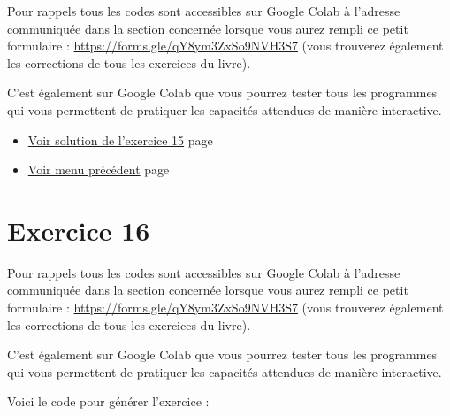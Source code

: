 \documentclass[a4paper,11pt]{book}
\begin{document}
\newpage

Pour rappels tous les codes sont accessibles sur Google Colab à
l'adresse communiquée dans la section concernée lorsque vous
aurez rempli ce petit formulaire : \url{https://forms.gle/qY8ym3ZxSo9NVH3S7}
(vous trouverez également les corrections de tous les exercices du
livre).

C'est également sur Google Colab que vous pourrez tester tous les
programmes qui vous permettent de pratiquer les capacités attendues
de manière interactive.


\begin{itemize}
\item \hyperref[orgb7308e1]{Voir solution de l'exercice 15}
page~\pageref{page:sec9.3.1-sol15}
\item \hyperref[org67109aa]{Voir menu précédent}
page~\pageref{page:capacity3}
\end{itemize}

\clearpage

\section{Exercice 16}
\label{sec:orgd834dec}
\label{org70c1962}
\label{page:sec3.4.2exo16}

Pour rappels tous les codes sont accessibles sur Google Colab à
l'adresse communiquée dans la section concernée lorsque vous
aurez rempli ce petit formulaire : \url{https://forms.gle/qY8ym3ZxSo9NVH3S7}
(vous trouverez également les corrections de tous les exercices du
livre).

C'est également sur Google Colab que vous pourrez tester tous les
programmes qui vous permettent de pratiquer les capacités attendues
de manière interactive.


Voici le code pour générer l'exercice :

\clearpage
\end{document}
